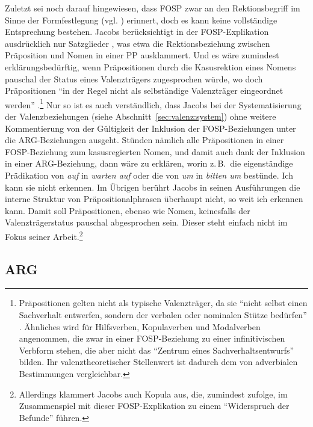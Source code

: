 Zuletzt sei noch darauf hingewiesen, dass FOSP zwar an den Rektionsbegriff im Sinne der Formfestlegung (vgl. \citealt[353ff]{Zifonun:03}) erinnert, doch es kann keine vollständige Entsprechung bestehen. Jacobs berücksichtigt in der FOSP-Explikation ausdrücklich nur Satzglieder \citep[14]{Jacobs:94}, was etwa die Rektionsbeziehung zwischen Präposition und Nomen in einer PP ausklammert. Und es wäre zumindest erklärungsbedürftig, wenn Präpositionen durch die Kasusrektion eines Nomens pauschal der Status eines Valenzträgers zugesprochen würde, wo doch Präpositionen "`in der Regel nicht als selbständige Valenzträger eingeordnet werden"' \citep[371]{Zifonun:03}.\footnote{Präpositionen gelten nicht als typische Valenzträger, da sie "`nicht selbst einen Sachverhalt entwerfen, sondern der verbalen oder nominalen Stütze bedürfen"' \citep[374]{Zifonun:03}. Ähnliches wird für Hilfsverben, Kopulaverben und Modalverben angenommen, die zwar in einer FOSP-Beziehung zu einer infinitivischen Verbform stehen, die aber nicht das "`Zentrum eines Sachverhaltsentwurfs"' \citep[375]{Zifonun:03} bilden. Ihr valenztheoretischer Stellenwert ist dadurch dem von adverbialen Bestimmungen vergleichbar.} Nur so ist es auch verständlich, dass Jacobs bei der Systematisierung der Valenzbeziehungen (siehe Abschnitt~\ref{sec:valenz:system}) ohne weitere Kommentierung von der Gültigkeit der Inklusion der FOSP-Beziehungen unter die ARG-Beziehungen ausgeht. Stünden nämlich alle Präpositionen in einer FOSP-Beziehung zum kasusregierten Nomen, und damit auch dank der Inklusion in einer ARG-Beziehung, dann wäre zu erklären, worin z.\,B.\ die eigenständige Prädikation von {\it auf} in {\it warten auf} oder die von {\it um} in {\it bitten um} bestünde. Ich kann sie nicht erkennen. Im Übrigen berührt Jacobs in seinen Ausführungen die interne Struktur von Präpositionalphrasen überhaupt nicht, so weit ich erkennen kann. Damit soll Präpositionen, ebenso wie Nomen, keinesfalls der Valenzträgerstatus pauschal abgesprochen sein. Dieser steht einfach nicht im Fokus seiner Arbeit.\footnote{Allerdings klammert Jacobs auch Kopula aus, die, zumindest \citet[374f]{Zifonun:03} zufolge, im Zusammenspiel mit dieser FOSP-Explikation zu einem "`Widerspruch der Befunde"' führen.}
 

\subsection{ARG} \label{sec-arg}

